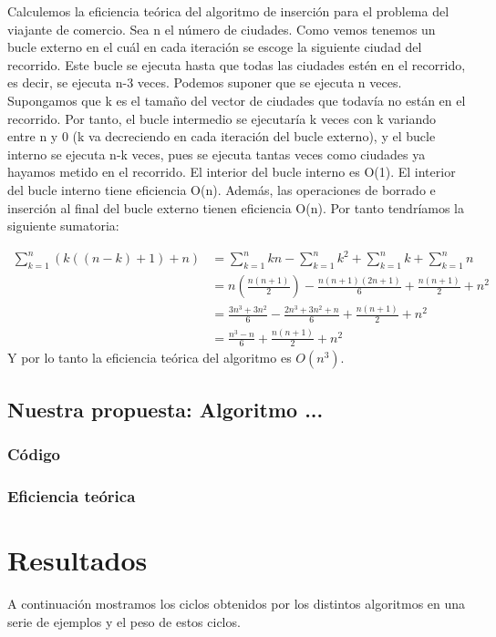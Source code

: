 \documentclass[a4]{article}
\begin{document}
Calculemos la eficiencia teórica del algoritmo de inserción para el
problema del viajante de comercio. Sea n el número de ciudades. Como
vemos tenemos un bucle externo en el cuál en cada iteración se escoge
la siguiente ciudad del recorrido. Este bucle se ejecuta hasta que
todas las ciudades estén en el recorrido, es decir, se ejecuta n-3
veces. Podemos suponer que se ejecuta n veces. Supongamos que k es el
tamaño del vector de ciudades que todavía no están en el
recorrido. Por tanto, el bucle intermedio se ejecutaría k veces con k
variando entre n y 0 (k va decreciendo en cada iteración del bucle
externo), y el bucle interno se ejecuta n-k veces, pues se ejecuta
tantas veces como ciudades ya hayamos metido en el recorrido. El
interior del bucle interno es O(1). El interior del bucle interno
tiene eficiencia O(n). Además, las operaciones de borrado e inserción
al final del bucle externo tienen eficiencia O(n). Por tanto
tendríamos la siguiente sumatoria:

\begin{align*}
\sum_{k=1}^{n}(k((n-k)+1)+n)&=\sum_{k=1}^{n}kn-\sum_{k=1}^{n}k^2+\sum_{k=1}^{n}k+\sum_{k=1}^{n}n\\&=n(\frac{n(n+1)}{2})-\frac{n(n+1)(2n+1)}{6}+\frac{n(n+1)}{2}+n^2\\&=\frac{3n^3+3n^2}{6}-\frac{2n^3+3n^2+n}{6}+\frac{n(n+1)}{2}+n^2\\&=\frac{n^3-n}{6}+\frac{n(n+1)}{2}+n^2
\end{align*}
Y por lo tanto la eficiencia teórica del algoritmo es $O(n^3)$.

\subsection{Nuestra propuesta: Algoritmo ...}

\subsubsection{Código}

\subsubsection{Eficiencia teórica}

\section{Resultados}

A continuación mostramos los ciclos obtenidos por los distintos
algoritmos en una serie de ejemplos y el peso de estos ciclos.
\end{document}
